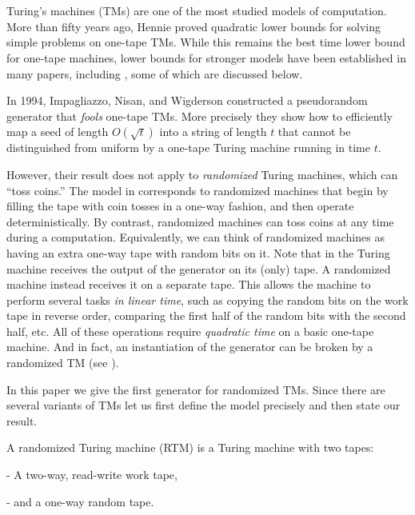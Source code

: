 
%
\section{}      %
Turing's machines (TMs) %
are one of the most studied models of computation.
More than fifty years ago, Hennie proved quadratic lower bounds \cite{DBLP:journals/iandc/Hennie65}
for solving simple problems on one-tape TMs. While this remains the
best time lower bound for one-tape machines, lower bounds for stronger
models have been established in many papers, %
 including \cite{PPST83,MR808746,MaS87,KalyanasundaramS92,DBLP:conf/coco/Santhanam01,DBLP:journals/tcs/MelkebeekR05,DBLP:journals/cc/Williams06},
some of which are discussed below.

In 1994, Impagliazzo, Nisan, and Wigderson constructed a pseudorandom
generator \cite{INW94} that \emph{fools }one-tape TMs. More precisely
they show how to efficiently map a seed of length $O(\sqrt{t})$ into
a string of length $t$ that cannot be distinguished from uniform
by a one-tape Turing machine running in time $t$.

However,   %
their result does not apply to \emph{randomized} Turing machines,
%
which %
can ``toss coins.'' 
The model in \cite{INW94} corresponds
to randomized machines that begin by filling the tape with coin tosses
in a one-way fashion, and then operate deterministically. By contrast,
randomized machines can toss coins at any time during a computation.
Equivalently, we can think of randomized machines as having an extra
one-way tape with random bits on it. Note that in \cite{INW94} the
Turing machine receives the output of the generator on its (only)
tape. A randomized machine instead receives it on a separate tape.
This allows the machine to perform several tasks \emph{in linear time},
such as copying the random bits on the work tape in reverse order,
comparing the first half of the random bits with the second half,
etc. All of these operations require \emph{quadratic time} on a basic
one-tape machine. And in fact, an instantiation of the \cite{INW94}
generator can be broken by a randomized TM  %
(see ).

In this paper we give the first generator for randomized TMs. Since
there are several variants of TMs let us first define the model precisely
and then state our result.
\begin{defn}
A randomized Turing machine (RTM) is a Turing machine with two tapes:

- A two-way, read-write work tape,

- and a one-way random tape.
\end{defn}

